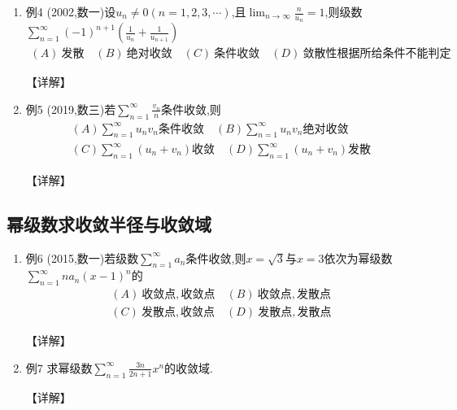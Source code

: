 \documentclass[12pt, a4paper, oneside, UTF8]{ctexbook}
\begin{document}
\begin{enumerate}[label=\arabic*.,start=4]
    \item 例4 (2002,数一)设$u_n\neq 0(n=1,2,3,\cdots)$,且$\lim_{n\rightarrow\infty}\frac{n}{u_n}=1$,则级数$\sum_{n=1}^{\infty}(-1)^{n+1}\left(\frac{1}{u_n}+\frac{1}{u_{n+1}}\right)$
    \begin{align*}
        (A)\ 发散 \quad (B)\ 绝对收敛 \quad (C)\ 条件收敛 \quad (D)\ 敛散性根据所给条件不能判定
    \end{align*}
    
    \begin{solution}
    【详解】
    \end{solution}
    
    \item 例5 (2019,数三)若$\sum_{n=1}^{\infty}\frac{v_n}{n}$条件收敛,则
    \begin{align*}
        (A)\sum_{n=1}^{\infty} u_n v_n\text{条件收敛} \quad (B)\sum_{n=1}^{\infty} u_n v_n\text{绝对收敛} \\
        (C)\sum_{n=1}^{\infty}\left(u_n+v_n\right)\text{收敛} \quad (D)\sum_{n=1}^{\infty}\left(u_n+v_n\right)\text{发散}
    \end{align*}
    
    \begin{solution}
    【详解】
    \end{solution}
\end{enumerate}

\subsection{幂级数求收敛半径与收敛域}

\begin{enumerate}[label=\arabic*.,start=6]
    \item 例6 (2015,数一)若级数$\sum_{n=1}^{\infty} a_n$条件收敛,则$x=\sqrt{3}$与$x=3$依次为幂级数$\sum_{n=1}^{\infty} n a_n(x-1)^n$的
    \begin{align*}
        (A)\ 收敛点,收敛点 \quad (B)\ 收敛点,发散点 \\
        (C)\ 发散点,收敛点 \quad (D)\ 发散点,发散点
    \end{align*}
    
    \begin{solution}
    【详解】
    \end{solution}
    
    \item 例7 求幂级数$\sum_{n=1}^{\infty}\frac{3n}{2n+1}x^n$的收敛域.
    
    \begin{solution}
    【详解】
    \end{solution}
\end{enumerate}
\end{document}
